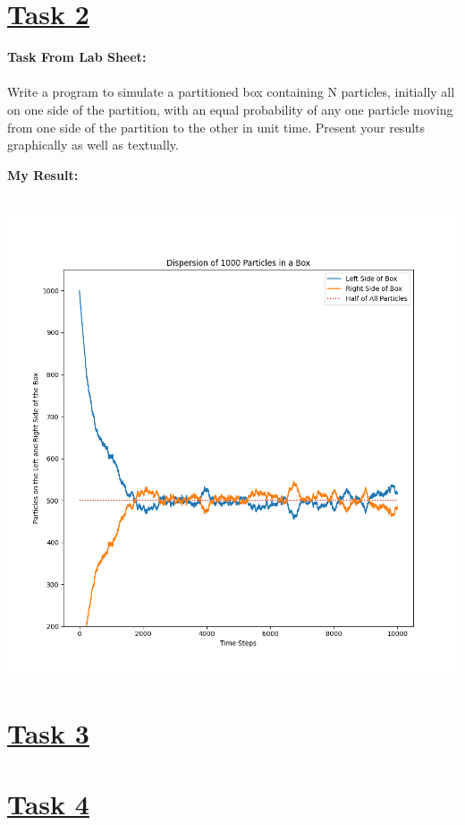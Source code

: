 \documentclass[12pt, A4]{article}
\begin{document}
\section*{\underline{Task 2}}
\hspace{1.5em}\textbf{Task From Lab Sheet:} \\ \\ Write a program to simulate a partitioned box containing N particles, initially all on one side of the partition, with an equal probability of any one particle moving from one side of the partition to the other in unit time. Present your results graphically as well as textually.

\vspace{1.5em}

\textbf{My Result:} \\ \\ 

\begin{center}
	\includegraphics[scale=0.5]{Task_2_Line}
\end{center}

\section*{\underline{Task 3}}

\section*{\underline{Task 4}}
\end{document}
